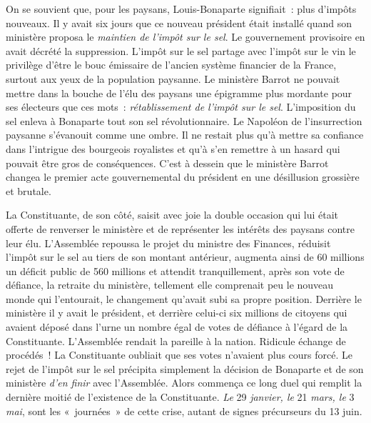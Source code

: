 \documentclass[french,twoside]{book} %
\begin{document}
On se souvient que, pour les paysans, Louis-Bonaparte signifiait : plus d’impôts nouveaux. Il y avait six jours que ce nouveau président était installé quand son ministère proposa le \emph{maintien de l’impôt sur le sel}. Le gouvernement provisoire en avait décrété la suppression. L’impôt sur le sel partage avec l’impôt sur le vin le privilège d’être le bouc émissaire de l’ancien système financier de la France, surtout aux yeux de la population paysanne. Le ministère Barrot ne pouvait mettre dans la bouche de l’élu des paysans une épigramme plus mordante pour ses électeurs que ces mots : \emph{rétablissement de l’impôt sur le sel}. L’imposition du sel enleva à Bonaparte tout son sel révolutionnaire. Le Napoléon de l’insurrection paysanne s’évanouit comme une ombre. Il ne restait plus qu’à mettre sa confiance dans l’intrigue des bourgeois royalistes et qu’à s’en remettre à un hasard qui pouvait être gros de conséquences. C’est à dessein que le ministère Barrot changea le premier acte gouvernemental du président en une désillusion grossière et brutale.\par
La Constituante, de son côté, saisit avec joie la double occasion qui lui était offerte de renverser le ministère et de représenter les intérêts des paysans contre leur élu. L’Assemblée repoussa le projet du ministre des Finances, réduisit l’impôt sur le sel au tiers de son montant antérieur, augmenta ainsi de 60 millions un déficit public de 560 millions et attendit tranquillement, après son vote de défiance, la retraite du ministère, tellement elle comprenait peu le nouveau monde qui l’entourait, le changement qu’avait subi sa propre position. Derrière le ministère il y avait le président, et derrière celui-ci six millions de citoyens qui avaient déposé dans l’urne un nombre égal de votes de défiance à l’égard de la Constituante. L’Assemblée rendait la pareille à la nation. Ridicule échange de procédés ! La Constituante oubliait que ses votes n’avaient plus cours forcé. Le rejet de l’impôt sur le sel précipita simplement la décision de Bonaparte et de son ministère \emph{d’en finir} avec l’Assemblée. Alors commença ce long duel qui remplit la dernière moitié de l’existence de la Constituante. \emph{Le} 29 \emph{janvier, le} 21 \emph{mars, le} 3 \emph{mai}, sont les « journées » de cette crise, autant de signes précurseurs du 13 juin.\par
\end{document}
